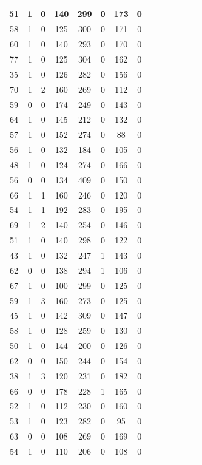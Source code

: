 \documentclass{article}
\begin{document}
\begin{center}
\begin{longtable}{|c|c|c|c|c|c|c|c|c|c|c|c|c|c|}
\hline
51 & 1 & 0 & 140 & 299 & 0 & 173 & 0 \\
\hline
58 & 1 & 0 & 125 & 300 & 0 & 171 & 0 \\
\hline
60 & 1 & 0 & 140 & 293 & 0 & 170 & 0 \\
\hline
77 & 1 & 0 & 125 & 304 & 0 & 162 & 0 \\
\hline
35 & 1 & 0 & 126 & 282 & 0 & 156 & 0 \\
\hline
70 & 1 & 2 & 160 & 269 & 0 & 112 & 0 \\
\hline
59 & 0 & 0 & 174 & 249 & 0 & 143 & 0 \\
\hline
64 & 1 & 0 & 145 & 212 & 0 & 132 & 0 \\
\hline
57 & 1 & 0 & 152 & 274 & 0 & 88 & 0 \\
\hline
56 & 1 & 0 & 132 & 184 & 0 & 105 & 0 \\
\hline
48 & 1 & 0 & 124 & 274 & 0 & 166 & 0 \\
\hline
56 & 0 & 0 & 134 & 409 & 0 & 150 & 0 \\
\hline
66 & 1 & 1 & 160 & 246 & 0 & 120 & 0 \\
\hline
54 & 1 & 1 & 192 & 283 & 0 & 195 & 0 \\
\hline
69 & 1 & 2 & 140 & 254 & 0 & 146 & 0 \\
\hline
51 & 1 & 0 & 140 & 298 & 0 & 122 & 0 \\
\hline
43 & 1 & 0 & 132 & 247 & 1 & 143 & 0 \\
\hline
62 & 0 & 0 & 138 & 294 & 1 & 106 & 0 \\
\hline
67 & 1 & 0 & 100 & 299 & 0 & 125 & 0 \\
\hline
59 & 1 & 3 & 160 & 273 & 0 & 125 & 0 \\
\hline
45 & 1 & 0 & 142 & 309 & 0 & 147 & 0 \\
\hline
58 & 1 & 0 & 128 & 259 & 0 & 130 & 0 \\
\hline
50 & 1 & 0 & 144 & 200 & 0 & 126 & 0 \\
\hline
62 & 0 & 0 & 150 & 244 & 0 & 154 & 0 \\
\hline
38 & 1 & 3 & 120 & 231 & 0 & 182 & 0 \\
\hline
66 & 0 & 0 & 178 & 228 & 1 & 165 & 0 \\
\hline
52 & 1 & 0 & 112 & 230 & 0 & 160 & 0 \\
\hline
53 & 1 & 0 & 123 & 282 & 0 & 95 & 0 \\
\hline
63 & 0 & 0 & 108 & 269 & 0 & 169 & 0 \\
\hline
54 & 1 & 0 & 110 & 206 & 0 & 108 & 0 \\

\end{longtable}
\end{center}
\end{document}
